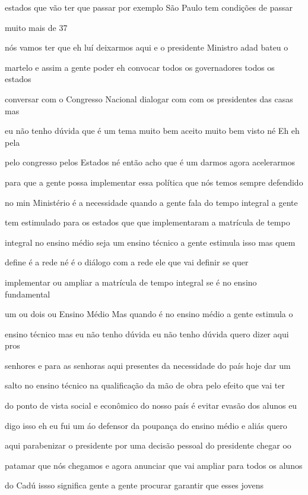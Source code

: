 \documentclass[a4paper,12pt]{article}
\begin{document}
estados que vão ter que passar por exemplo São Paulo tem condições de passar

muito mais de 37%

nós vamos ter que eh luí deixarmos aqui e o presidente Ministro adad bateu o

martelo e assim a gente poder eh convocar todos os governadores todos os estados

conversar com o Congresso Nacional dialogar com com os presidentes das casas mas

eu não tenho dúvida que é um tema muito bem aceito muito bem visto né Eh eh pela

pelo congresso pelos Estados né então acho que é um darmos agora acelerarmos

para que a gente possa implementar essa política que nós temos sempre defendido

no min Ministério é a necessidade quando a gente fala do tempo integral a gente

tem estimulado para os estados que que implementaram a matrícula de tempo

integral no ensino médio seja um ensino técnico a gente estimula isso mas quem

define é a rede né é o diálogo com a rede ele que vai definir se quer

implementar ou ampliar a matrícula de tempo integral se é no ensino fundamental

um ou dois ou Ensino Médio Mas quando é no ensino médio a gente estimula o

ensino técnico mas eu não tenho dúvida eu não tenho dúvida quero dizer aqui pros

senhores e para as senhoras aqui presentes da necessidade do país hoje dar um

salto no ensino técnico na qualificação da mão de obra pelo efeito que vai ter

do ponto de vista social e econômico do nosso país é evitar evasão dos alunos eu

digo isso eh eu fui um áo defensor da poupança do ensino médio e aliás quero

aqui parabenizar o presidente por uma decisão pessoal do presidente chegar oo

patamar que nós chegamos e agora anunciar que vai ampliar para todos os alunos

do Cadú issso significa gente a gente procurar garantir que esses jovens
\end{document}

